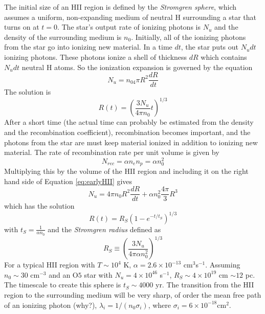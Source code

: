 The initial size of an HII region is defined by the \emph{Stromgren sphere}, which assumes 
a uniform, non-expanding medium of neutral H surrounding a star that turns on at $t=0$.  The 
star's output rate of ionizing photons is $N_u$ and the density of the surrounding medium is 
$n_0$.  Initially, all of the ionizing photons from the star go into ionizing new material.  
In a time $dt$, the star puts out $N_udt$ ionizing photons.  These photons ionize a shell of 
thickness $dR$ which contains $N_udt$ neutral H atoms.  So the ionization expansion is governed 
by the equation
\begin{equation}\label{eq:earlyHII}
N_u=n_04\pi R^2\frac{dR}{dt}
\end{equation}
The solution is 
\begin{equation}
R(t)=\left(\frac{3N_u}{4\pi n_0}t\right)^{1/3}
\end{equation}
After a short time (the actual time can probably be estimated from the density and the 
recombination coefficient), recombination becomes important, and the photons from the star are 
must keep material ionized in addition to ionizing new material.  The rate of recombination 
rate per unit volume is given by 
\begin{equation}
N_{rec}=\alpha n_en_p=\alpha n_0^2
\end{equation}
Multiplying this by the volume of the HII region and including it on the right hand side of 
Equation \ref{eq:earlyHII} gives
\begin{equation}
N_u=4\pi n_0R^2\frac{dR}{dt}+\alpha n_0^2\frac{4\pi}{3}R^3
\end{equation}
which has the solution
\begin{equation}
R(t)=R_S\left(1-e^{-t/t_S}\right)^{1/3}
\end{equation}
with $t_S=\frac{1}{\alpha n_0}$ and the \emph{Stromgren radius} defined as 
\begin{equation}
R_S\equiv\left(\frac{3N_u}{4\pi \alpha n_0^2}\right)^{1/3}
\end{equation}
For a typical HII region with $T\sim10^4$ K, $\alpha=2.6\times10^{-13}$ cm$^3$s$^{-1}$.  
Assuming $n_0\sim30$ cm$^{-3}$ and an O$5$ star with $N_u=4\times10^{46}$ s$^{-1}$, 
$R_S\sim4\times10^{19}$ cm $\sim12$ pc.  The timescale to create this sphere is $t_S\sim4000$ yr.
The transition from the HII region to the surrounding medium will be very sharp, of order 
the mean free path of an ionizing photon (why?), $\lambda_i=1/(n_0\sigma_i)$, where 
$\sigma_i=6\times10^{-18} $cm$^2$.

